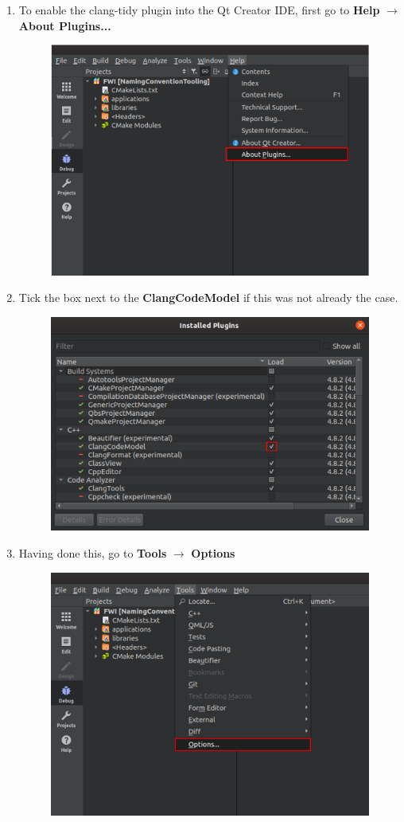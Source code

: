 \documentclass[10pt]{article}
\begin{document}
\begin{enumerate}
\item To enable the clang-tidy plugin into the Qt Creator IDE, first go to \textbf{Help} $\rightarrow$ \textbf{About Plugins...}
\begin{figure}[h!]
\centering
\includegraphics[width=0.6 \textwidth]{clang-tidy1.png}
\end{figure}

\item Tick the box next to the \textbf{ClangCodeModel} if this was not already the case.
\begin{figure}[h!]
\centering
\includegraphics[width=0.6 \textwidth]{clang-tidy2.png}
\end{figure}

\newpage

\item Having done this, go to \textbf{Tools} $\rightarrow$ \textbf{Options}
\begin{figure}[h!]
\centering
\includegraphics[width=0.6 \textwidth]{clang-tidy3.png}
\end{figure}


\end{enumerate}
\end{document}
